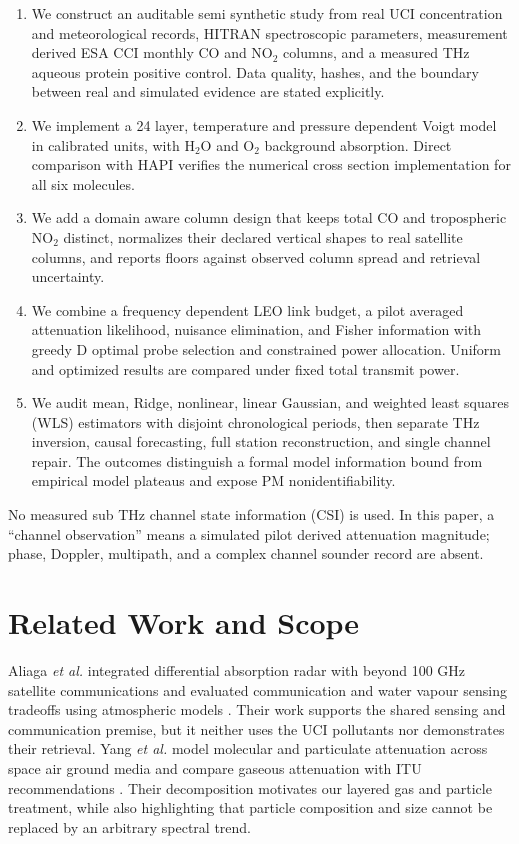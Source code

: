 \documentclass[conference]{IEEEtran}
\begin{document}
\begin{enumerate}
\item We construct an auditable semi synthetic study from real UCI concentration and meteorological records, HITRAN spectroscopic parameters, measurement derived ESA CCI monthly CO and NO$_2$ columns, and a measured THz aqueous protein positive control. Data quality, hashes, and the boundary between real and simulated evidence are stated explicitly.
\item We implement a 24 layer, temperature and pressure dependent Voigt model in calibrated units, with H$_2$O and O$_2$ background absorption. Direct comparison with HAPI verifies the numerical cross section implementation for all six molecules.
\item We add a domain aware column design that keeps total CO and tropospheric NO$_2$ distinct, normalizes their declared vertical shapes to real satellite columns, and reports floors against observed column spread and retrieval uncertainty.
\item We combine a frequency dependent LEO link budget, a pilot averaged attenuation likelihood, nuisance elimination, and Fisher information with greedy D optimal probe selection and constrained power allocation. Uniform and optimized results are compared under fixed total transmit power.
\item We audit mean, Ridge, nonlinear, linear Gaussian, and weighted least squares (WLS) estimators with disjoint chronological periods, then separate THz inversion, causal forecasting, full station reconstruction, and single channel repair. The outcomes distinguish a formal model information bound from empirical model plateaus and expose PM nonidentifiability.
\end{enumerate}

No measured sub THz channel state information (CSI) is used. In this paper, a ``channel observation'' means a simulated pilot derived attenuation magnitude; phase, Doppler, multipath, and a complex channel sounder record are absent.

\section{Related Work and Scope}

Aliaga \emph{et al.} integrated differential absorption radar with beyond 100 GHz satellite communications and evaluated communication and water vapour sensing tradeoffs using atmospheric models \cite{aliaga2024dar}. Their work supports the shared sensing and communication premise, but it neither uses the UCI pollutants nor demonstrates their retrieval. Yang \emph{et al.} model molecular and particulate attenuation across space air ground media and compare gaseous attenuation with ITU recommendations \cite{yang2024attenuation}. Their decomposition motivates our layered gas and particle treatment, while also highlighting that particle composition and size cannot be replaced by an arbitrary spectral trend.
\end{document}
